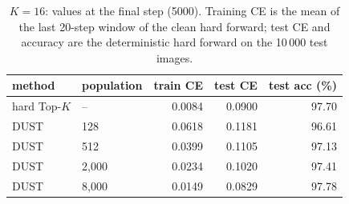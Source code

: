 \begin{table}[H]
\centering
\caption{$K = 16$: values at the final step (5000). Training CE is the mean of the last 20-step window of the clean hard forward; test CE and accuracy are the deterministic hard forward on the 10\,000 test images.}
\label{tab:k16}
\begin{tabular}{llrrr}
\toprule
    method & population & train CE & test CE & test acc (\%) \\
\midrule
    hard Top-$K$ & -- & 0.0084 & 0.0900 & 97.70 \\
    DUST & 128 & 0.0618 & 0.1181 & 96.61 \\
    DUST & 512 & 0.0399 & 0.1105 & 97.13 \\
    DUST & 2,000 & 0.0234 & 0.1020 & 97.41 \\
    DUST & 8,000 & 0.0149 & 0.0829 & 97.78 \\
\bottomrule
\end{tabular}
\end{table}
